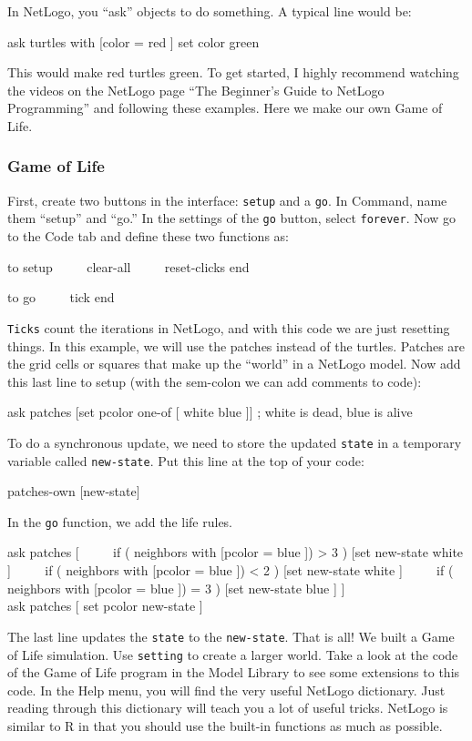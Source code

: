 \documentclass[
  a4paper,
  DIV=11,
  numbers=noendperiod,
  oneside]{scrreprt}
\begin{document}
In NetLogo, you ``ask'' objects to do something. A typical line would
be:

{ask} {turtles with} {{[}}{color =} {red} {]} {set} {color} {green}

This would make red turtles green. To get started, I highly recommend
watching the videos on the NetLogo page ``The Beginner's Guide to
NetLogo Programming'' and following these examples. Here we make our own
Game of Life.

\subsubsection{Game of Life}\label{sec-Game-of-Life}

First, create two buttons in the interface: \texttt{setup} and a
\texttt{go}. In Command, name them ``setup'' and ``go.'' In the settings
of the \texttt{go} button, select \texttt{forever}. Now go to the Code
tab and define these two functions as:

{to} {setup} ~~~~ {clear-all} ~~~~ {reset-clicks} {end}

{to} {go} ~~~~ {tick} {end}

\texttt{Ticks} count the iterations in NetLogo, and with this code we
are just resetting things. In this example, we will use the patches
instead of the turtles. Patches are the grid cells or squares that make
up the ``world'' in a NetLogo model. Now add this last line to setup
(with the sem-colon we can add comments to code):

{ask} {patches} {{[}}{set} {pcolor one-of} {{[}} {white blue} {]}{]} {;
white is dead, blue is alive}

To do a synchronous update, we need to store the updated \texttt{state}
in a temporary variable called \texttt{new-state}. Put this line at the
top of your code:

{patches-own} {{[}new-state{]}}

In the \texttt{go} function, we add the life rules.

{ask} {patches} {{[}} ~~~~ {if} {(} {neighbors with} {{[}}{pcolor =}
{blue} {]}) {\textgreater{}} {3} {)} {{[}}{set} {new-state} {white} {]}
~~~~ {if} {(} {neighbors with} {{[}}{pcolor =} {blue} {]}) {\textless{}}
{2} {)} {{[}}{set} {new-state} {white} {]} ~~~~ {if} {(} {neighbors
with} {{[}}{pcolor =} {blue} {]}) {=} {3} {)} {{[}}{set} {new-state}
{blue} {]} {{]}}\\
{ask} {patches} {[} {}{set} {pcolor} {new-state} {]}

The last line updates the \texttt{state} to the \texttt{new-state}. That
is all! We built a Game of Life simulation. Use \texttt{setting} to
create a larger world. Take a look at the code of the Game of Life
program in the Model Library to see some extensions to this code. In the
Help menu, you will find the very useful NetLogo dictionary. Just
reading through this dictionary will teach you a lot of useful tricks.
NetLogo is similar to R in that you should use the built-in functions as
much as possible.
\end{document}
